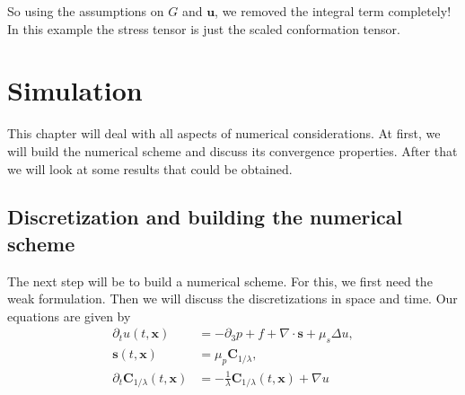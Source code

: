 \documentclass[12pt,a4paper,twoside, open=right]{scrreprt}
\theoremstyle{definition}
\theoremstyle{plain}
\newcommand{\bfu}{\bm{u}}
\newcommand{\bfs}{\bm{s}}
\newcommand{\bfC}{\bm{C}}
\newcommand{\bfx}{\bm{x}}
\begin{document}
So using the assumptions on $G$ and $\bfu$, we removed the integral term completely! In this example the stress tensor is just the scaled conformation tensor. 
\chapter{Simulation}
This chapter will deal with all aspects of numerical considerations. At first, we will build the numerical scheme and discuss its convergence properties. After that we will look at some results that could be obtained.
\section{Discretization and building the numerical scheme}
The next step will be to build a numerical scheme. For this, we first need the weak formulation. Then we will discuss the discretizations in space and time. Our equations are given by 
\begin{align}
    \label{eq:transfeq1}
    \partial_t u(t,\bfx) &= -\partial_3 p + f +\nabla\cdot \bfs+\mu_s\Delta u,\\
    \label{eq:transfeq2}
    \bfs(t,\bfx)&=\mu_p\bfC_{1/\lambda},\\
    \partial_t\bfC_{1/\lambda}(t,\bfx) &= -\frac{1}{\lambda}\bfC_{1/\lambda}(t,\bfx)+\nabla u
    \label{eq:transfeq3}
\end{align}
\end{document}
